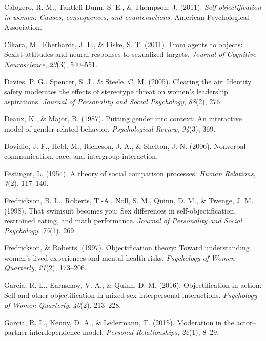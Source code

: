 \documentclass[man]{apa6}
\begin{document}
\hypertarget{ref-calogero2011}{}
Calogero, R. M., Tantleff-Dunn, S. E., \& Thompson, J. (2011).
\emph{Self-objectification in women: Causes, consequences, and
counteractions.} American Psychological Association.

\hypertarget{ref-cikara2011agents}{}
Cikara, M., Eberhardt, J. L., \& Fiske, S. T. (2011). From agents to
objects: Sexist attitudes and neural responses to sexualized targets.
\emph{Journal of Cognitive Neuroscience}, \emph{23}(3), 540--551.

\hypertarget{ref-davies2005clearing}{}
Davies, P. G., Spencer, S. J., \& Steele, C. M. (2005). Clearing the
air: Identity safety moderates the effects of stereotype threat on
women's leadership aspirations. \emph{Journal of Personality and Social
Psychology}, \emph{88}(2), 276.

\hypertarget{ref-deaux1987putting}{}
Deaux, K., \& Major, B. (1987). Putting gender into context: An
interactive model of gender-related behavior. \emph{Psychological
Review}, \emph{94}(3), 369.

\hypertarget{ref-dovidio2006nonverbal}{}
Dovidio, J. F., Hebl, M., Richeson, J. A., \& Shelton, J. N. (2006).
Nonverbal communication, race, and intergroup interaction.

\hypertarget{ref-festinger1954theory}{}
Festinger, L. (1954). A theory of social comparison processes.
\emph{Human Relations}, \emph{7}(2), 117--140.

\hypertarget{ref-fredrickson1998swimsuit}{}
Fredrickson, B. L., Roberts, T.-A., Noll, S. M., Quinn, D. M., \&
Twenge, J. M. (1998). That swimsuit becomes you: Sex differences in
self-objectification, restrained eating, and math performance.
\emph{Journal of Personality and Social Psychology}, \emph{75}(1), 269.

\hypertarget{ref-robertsfredrickson}{}
Fredrickson, \& Roberts. (1997). Objectification theory: Toward
understanding women's lived experiences and mental health risks.
\emph{Psychology of Women Quarterly}, \emph{21}(2), 173--206.

\hypertarget{ref-garcia2016objectification}{}
Garcia, R. L., Earnshaw, V. A., \& Quinn, D. M. (2016). Objectification
in action: Self-and other-objectification in mixed-sex interpersonal
interactions. \emph{Psychology of Women Quarterly}, \emph{40}(2),
213--228.

\hypertarget{ref-garcia2015moderation}{}
Garcia, R. L., Kenny, D. A., \& Ledermann, T. (2015). Moderation in the
actor--partner interdependence model. \emph{Personal Relationships},
\emph{22}(1), 8--29.
\end{document}
